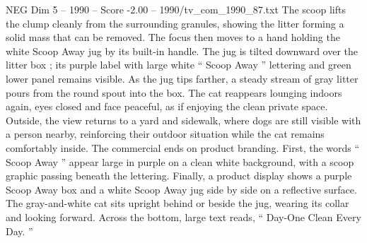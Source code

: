 \begin{textsample}{NEG Dim 5 – 1990 – Score -2.00 – 1990/tv\_com\_1990\_87.txt}
The scoop lifts the clump cleanly from the surrounding granules, showing the litter forming a solid mass that can be removed.
The focus then moves to a hand holding the white Scoop Away jug by its built-in handle.
The jug is tilted downward over the litter box ; its purple label with large white “ Scoop Away ” lettering and green lower panel remains visible.
As the jug tips farther, a steady stream of gray litter pours from the round spout into the box.
The cat reappears lounging indoors again, eyes closed and face peaceful, as if enjoying the clean private space.
Outside, the view returns to a yard and sidewalk, where dogs are still visible with a person nearby, reinforcing their outdoor situation while the cat remains comfortably inside.
The commercial ends on product branding.
First, the words “ Scoop Away ” appear large in purple on a clean white background, with a scoop graphic passing beneath the lettering.
Finally, a product display shows a purple Scoop Away box and a white Scoop Away jug side by side on a reflective surface.
The gray-and-white cat sits upright behind or beside the jug, wearing its collar and looking forward.
Across the bottom, large text reads, “ Day-One Clean Every Day. ”

\end{textsample}
